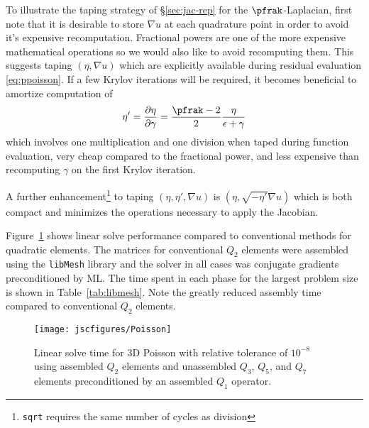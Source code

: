 To illustrate the taping strategy of \S\ref{sec:jac-rep} for the $\pfrak$-Laplacian, first note that it is
desirable to store $\nabla u$ at each quadrature point in order to avoid it's expensive recomputation.  Fractional
powers are one of the more expensive mathematical operations so we would also like to avoid recomputing them.  This
suggests taping $(\eta,\nabla u)$ which are explicitly available during residual evaluation \eqref{eq:ppoisson}.  If a
few Krylov iterations will be required, it becomes beneficial to amortize computation of
\begin{equation*}
  \eta' = \frac{\partial \eta}{\partial \gamma} = \frac{\pfrak-2}{2} \frac{\eta}{\epsilon + \gamma}
\end{equation*}
which involves one multiplication and one division when taped during function evaluation, very cheap compared to the
fractional power, and less expensive than recomputing $\gamma$ on the first Krylov iteration.

A further enhancement\footnote{\texttt{sqrt} requires the same number of cycles as division} to taping
$(\eta,\eta',\nabla u)$ is $(\eta,\sqrt{-\eta'}\nabla u)$ which is both compact and minimizes the operations necessary
to apply the Jacobian.

Figure~\ref{fig:libmesh} shows linear solve performance compared to conventional methods for quadratic elements.  The
matrices for conventional $Q_2$ elements were assembled using the \texttt{libMesh} library and the solver in all cases was
conjugate gradients preconditioned by ML.  The time spent in each phase for the largest problem size is shown in
Table~\ref{tab:libmesh}.  Note the greatly reduced assembly time compared to conventional $Q_2$ elements.

\begin{figure}
  \centering\texttt{[image: jscfigures/Poisson]}
  \caption{Linear solve time for 3D Poisson with relative tolerance of $10^{-8}$ using assembled $Q_2$ elements and
    unassembled $Q_3$, $Q_5$, and $Q_7$ elements preconditioned by an assembled $Q_1$ operator.}\label{fig:libmesh}
\end{figure}

